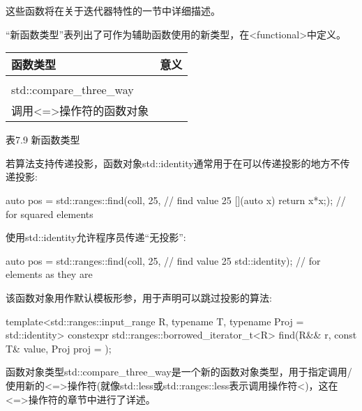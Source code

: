 这些函数将在关于迭代器特性的一节中详细描述。


“新函数类型”表列出了可作为辅助函数使用的新类型，在<functional>中定义。

\begin{longtable}[c]{|l|l|}
\hline
\textbf{函数类型} &
\textbf{意义} \\ \hline
\endfirsthead
%
\endhead
%
\begin{tabular}[c]{@{}l@{}}std::identity\\ std::compare\_three\_way\end{tabular} &
\begin{tabular}[c]{@{}l@{}}返回自身的函数对象\\ 调用\textless{}=\textgreater{}操作符的函数对象\end{tabular} \\ \hline
\end{longtable}

\begin{center}
表7.9 新函数类型
\end{center}

若算法支持传递投影，函数对象std::identity通常用于在可以传递投影的地方不传递投影:

\begin{cpp}
auto pos = std::ranges::find(coll, 25, // find value 25
							[](auto x) {return x*x;}); // for squared elements
\end{cpp}

使用std::identity允许程序员传递“无投影”:

\begin{cpp}
auto pos = std::ranges::find(coll, 25, // find value 25
							std::identity{}); // for elements as they are
\end{cpp}

该函数对象用作默认模板形参，用于声明可以跳过投影的算法:

\begin{cpp}
template<std::ranges::input_range R,
		typename T,
		typename Proj = std::identity>
constexpr std::ranges::borrowed_iterator_t<R>
find(R&& r, const T& value, Proj proj = {});
\end{cpp}

函数对象类型std::compare\_three\_way是一个新的函数对象类型，用于指定调用/使用新的<=>操作符(就像std::less或std::ranges::less表示调用操作符<)，这在<=>操作符的章节中进行了详述。



